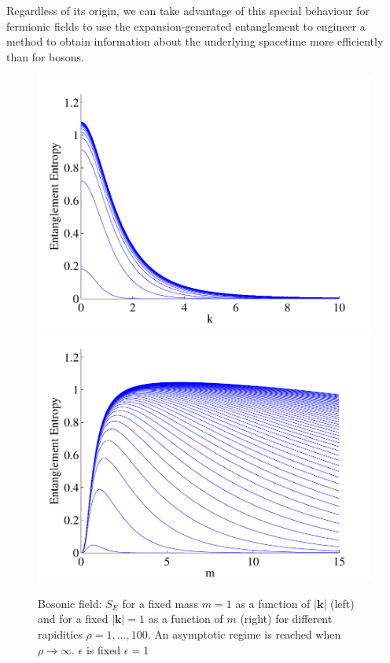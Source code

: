 Regardless of its origin, we can take advantage of this special behaviour for fermionic fields to use the expansion-generated entanglement to engineer a method to obtain information about the underlying spacetime more efficiently than for bosons. 
\begin{figure}[H]
\begin{center}
\includegraphics[width=.525\textwidth]{bosok}\!\!\!\!\!\!\!\!\!\!\!\!\!\!
\includegraphics[width=.525\textwidth]{bosom}
\end{center}
\caption{Bosonic field: $S_E$ for a fixed mass $m=1$ as a function of $|\bm k|$ (left) and for a fixed $|\bm k|=1$ as a function of $m$ (right) for different rapidities $\rho=1,\dots,100$. An asymptotic regime is reached when $\rho\rightarrow\infty$. $\epsilon$ is fixed $\epsilon=1$}
\label{bosons}
\end{figure}


